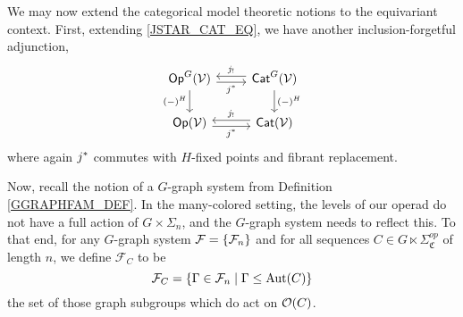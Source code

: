\documentclass[a4paper,10pt
,draft
]{article}%
\renewcommand{\F}{\mathcal F}
\renewcommand{\1}{\eta}%
\newcommand{\SC}{\Sigma_{\mathfrak C}}
\begin{document}
We may now extend the categorical model theoretic notions to the equivariant context.
First, extending \eqref{JSTAR_CAT_EQ}, we have another inclusion-forgetful adjunction,      
\begin{equation}
      \label{JSTAR_EQ}
      \begin{tikzcd}
            \mathsf{Op}^G(\V) \arrow[d, "(-)^H"']
            \arrow[r, shift right, "j^*"']
            &
            \mathsf{Cat}^G(\V) \arrow[l, shift right, swap, "j_!"] \arrow[d, "(-)^H"]
            \\
            \Op(\V) \arrow[r, shift right, "j^*"']
            &
            \Cat(\V) \arrow[l, shift right, swap, "j_!"]
      \end{tikzcd}
\end{equation}
where again $j^{\**}$ commutes with $H$-fixed points and fibrant replacement.

Now, recall the notion of a $G$-graph system from Definition \ref{GGRAPHFAM_DEF}.
In the many-colored setting, the levels of our operad do not have a full action of $G \times \Sigma_n$, and the $G$-graph system needs to reflect this.
To that end, for any $G$-graph system $\F = \set{\F_n}$ and for all sequences $C \in G \ltimes \SC^{op}$ of length $n$, we define
$\F_C$ to be
\[
      \F_C = \sets{\Gamma \in \F_n}{\Gamma \leq \Aut(C)}
\]
the set of those graph subgroups which do act on $\mathcal{O}(C)$.
\end{document}
